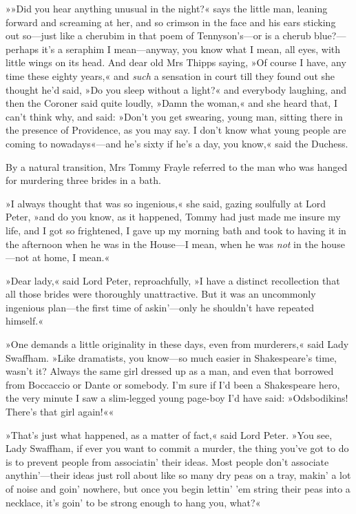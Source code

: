 »»Did you hear anything unusual in the night?« says the little man, leaning forward and screaming at her, and so crimson in the face and his ears sticking out so\allowbreak---\allowbreak just like a cherubim in that poem of Tennyson's\allowbreak---\allowbreak or is a cherub blue?---perhaps it's a seraphim I mean\allowbreak---\allowbreak anyway, you know what I mean, all eyes, with little wings on its head. And dear old Mrs Thipps saying, »Of course I have, any time these eighty years,« and \textit{such} a sensation in court till they found out she thought he'd said, »Do you sleep without a light?« and everybody laughing, and then the Coroner said quite loudly, »Damn the woman,« and she heard that, I can't think why, and said: »Don't you get swearing, young man, sitting there in the presence of Providence, as you may say. I don't know what young people are coming to nowadays«---and he's sixty if he's a day, you know,« said the Duchess.

By a natural transition, Mrs Tommy Frayle referred to the man who was hanged for murdering three brides in a bath.

»I always thought that was so ingenious,« she said, gazing soulfully at Lord Peter, »and do you know, as it happened, Tommy had just made me insure my life, and I got so frightened, I gave up my morning bath and took to having it in the afternoon when he was in the House\allowbreak---\allowbreak I mean, when he was \textit{not} in the house\allowbreak---\allowbreak not at home, I mean.«

»Dear lady,« said Lord Peter, reproachfully, »I have a distinct recollection that all those brides were thoroughly unattractive. But it was an uncommonly ingenious plan\allowbreak---\allowbreak the first time of askin'---only he shouldn't have repeated himself.«

»One demands a little originality in these days, even from murderers,« said Lady Swaffham. »Like dramatists, you know\allowbreak---\allowbreak so much easier in Shakespeare's time, wasn't it? Always the same girl dressed up as a man, and even that borrowed from Boccaccio or Dante or somebody. I'm sure if I'd been a Shakespeare hero, the very minute I saw a slim-legged young page-boy I'd have said: »Odsbodikins! There's that girl again!««

»That's just what happened, as a matter of fact,« said Lord Peter. »You see, Lady Swaffham, if ever you want to commit a murder, the thing you've got to do is to prevent people from associatin' their ideas. Most people don't associate anythin'---their ideas just roll about like so many dry peas on a tray, makin' a lot of noise and goin' nowhere, but once you begin lettin' 'em string their peas into a necklace, it's goin' to be strong enough to hang you, what?«

